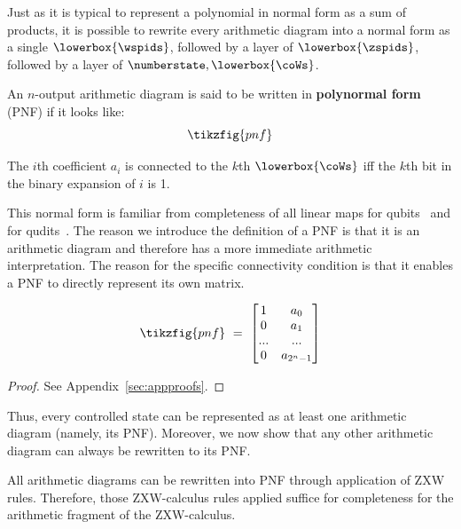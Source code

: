 Just as it is typical to represent a polynomial in normal form as a sum of products, it is possible to rewrite every arithmetic diagram into a normal form as a single $\lowerbox{\wspids}$, followed by a layer of $\lowerbox{\zspids}$, followed by a layer of $\numberstate, \lowerbox{\coWs}$. 

\begin{definition}
    An $n$-output arithmetic diagram is said to be written in \textbf{polynormal form} (PNF) if it looks like:
    \begin{equation}
        \tikzfig{pnf}
    \end{equation}

    The $i$th coefficient $a_i$ is connected to the $k$th $\lowerbox{\coWs}$ iff the $k$th bit in the binary expansion of $i$ is 1. 
\end{definition}

This normal form is familiar from completeness of all linear maps for qubits~\cite{Hadzihasanovic2018zwzxcomplete} and for qudits~\cite{poor2023completeness}. The reason we introduce the definition of a PNF is that it is an arithmetic diagram and therefore has a more immediate arithmetic interpretation. The reason for the specific connectivity condition is that it enables a PNF to directly represent its own matrix.

\begin{prop}\label{prop:vec_pnf}
    \begin{gather}\label{eq:pnf_vec}
        \tikzfig{pnf} ~=~ 
        \begin{bmatrix}
            1 &  a_0 \\ 0 & a_1 \\ ... & ... \\ 0 & a_{2^n-1}
        \end{bmatrix}
    \end{gather}
\end{prop} 

\begin{proof}
    See Appendix~\ref{sec:appproofs}.
\end{proof}

Thus, every controlled state can be represented as at least one arithmetic diagram (namely, its PNF). Moreover, we now show that any other arithmetic diagram can always be rewritten to its PNF.


\begin{thm}\label{thm:uni_pnf}
    All arithmetic diagrams can be rewritten into PNF through application of ZXW rules. Therefore, those ZXW-calculus rules applied suffice for completeness for the arithmetic fragment of the ZXW-calculus.
\end{thm}

